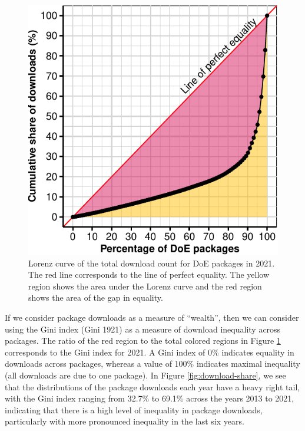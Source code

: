 \begin{figure}[htbp]

{\centering \includegraphics{figures/plot-lorenz-1} 

}

\caption{Lorenz curve of the total download count for DoE packages in 2021. The red line corresponds to the line of perfect equality. The yellow region shows the area under the Lorenz curve and the red region shows the area of the gap in equality.}\label{fig:plot-lorenz}
\end{figure}

If we consider package downloads as a measure of ``wealth'', then we can consider using the Gini index (Gini 1921) as a measure of download inequality across packages. The ratio of the red region to the total colored regions in Figure \ref{fig:plot-lorenz} corresponds to the Gini index for 2021. A Gini index of 0\% indicates equality in downloads across packages, whereas a value of 100\% indicates maximal inequality (all downloads are due to one package). In Figure \ref{fig:download-share}, we see that the distributions of the package downloads each year have a heavy right tail, with the Gini index ranging from 32.7\% to 69.1\% across the years 2013 to 2021, indicating that there is a high level of inequality in package downloads, particularly with more pronounced inequality in the last six years.

